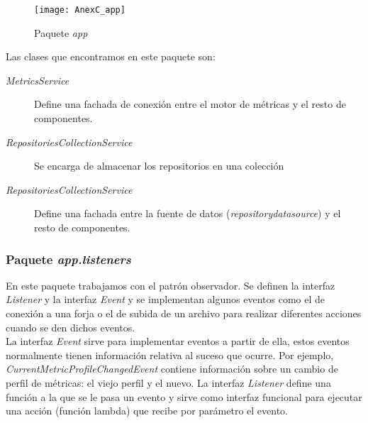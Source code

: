 \begin{figure}[!h]
	\centering
	\texttt{[image: AnexC\_app]}
	\caption{Paquete \textit{app}}\label{fig:AnexC_app}
\end{figure}
\FloatBarrier

Las clases que encontramos en este paquete son:
\begin{description}
	\item[\textit{MetricsService}] Define una fachada de conexión entre el motor de métricas y el resto de componentes.
	\item[\textit{RepositoriesCollectionService}] Se encarga de almacenar los repositorios en una colección
	\item[\textit{RepositoriesCollectionService}] Define una fachada entre la fuente de datos (\textit{repositorydatasource}) y el resto de componentes.
\end{description}

\subsubsection{Paquete \textit{app.listeners}}
En este paquete trabajamos con el patrón observador. Se definen la interfaz \textit{Listener} y la interfaz \textit{Event} y se implementan algunos eventos como el de conexión a una forja o el de subida de un archivo para realizar diferentes acciones cuando se den dichos eventos.\\ 
La interfaz \textit{Event} sirve para implementar eventos a partir de ella, estos eventos normalmente tienen información relativa al suceso que ocurre. Por ejemplo, \textit{CurrentMetricProfileChangedEvent} contiene información sobre un cambio de perfil de métricas: el viejo perfil y el nuevo. La interfaz \textit{Listener} define una función a la que se le pasa un evento y sirve como interfaz funcional para ejecutar una acción (función lambda) que recibe por parámetro el evento.
